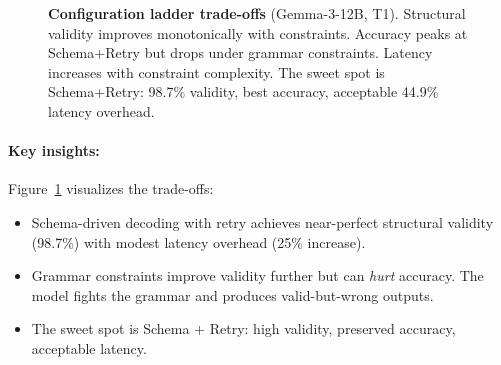 \documentclass[11pt]{article}
\begin{document}
\begin{figure}[t]
\centering
{}
\caption{\textbf{Configuration ladder trade-offs} (Gemma-3-12B, T1).  Structural validity improves monotonically with constraints.  Accuracy peaks at Schema+Retry but drops under grammar constraints.  Latency increases with constraint complexity.  The sweet spot is Schema+Retry: 98.7\% validity, best accuracy, acceptable 44.9\% latency overhead.}
\label{fig:config-ladder-chart}
\end{figure}

\paragraph{Key insights:}
Figure~\ref{fig:config-ladder-chart} visualizes the trade-offs:
\begin{itemize}[leftmargin=12pt]
    \item Schema-driven decoding with retry achieves near-perfect structural validity (98.7\%) with modest latency overhead (25\% increase).
    \item Grammar constraints improve validity further but can \emph{hurt} accuracy.  The model fights the grammar and produces valid-but-wrong outputs.
    \item The sweet spot is Schema + Retry: high validity, preserved accuracy, acceptable latency.
\end{itemize}
\end{document}
